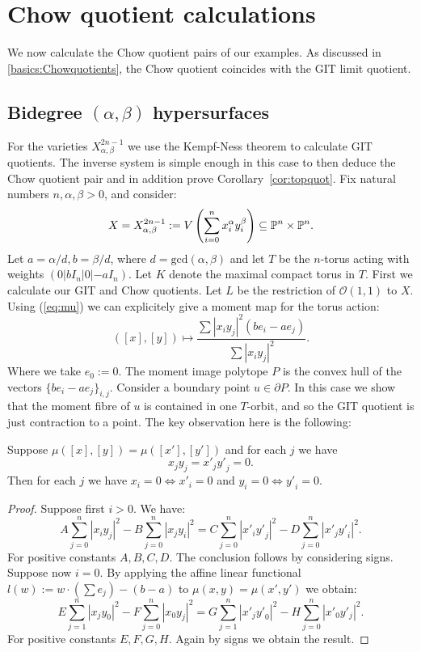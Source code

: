 \section{Chow quotient calculations}
We now calculate the Chow quotient pairs of our examples. As discussed in \ref{basics:Chowquotients}, the Chow quotient coincides with the GIT limit quotient.
\subsection{Bidegree $(\alpha,\beta)$ hypersurfaces} \label{subsec:hypersurfaces}
For the varieties \(X_{\alpha,\beta}^{2n-1}\) we use the Kempf-Ness theorem to calculate GIT quotients. The inverse system is simple enough in this case to then deduce the Chow quotient pair and in addition prove Corollary~\ref{cor:topquot}. Fix natural numbers \(n,\alpha,\beta>0\), and consider:
\[
X = X_{\alpha,\beta}^{2n-1} := V \left( \sum_{i=0}^n x_i^\alpha y_i^\beta \right) \subseteq \mathbb{P}^n \times \mathbb{P}^n.
\]
Let \(a = \alpha/d, b = \beta/d\), where \(d = \text{gcd}(\alpha,\beta)\) and let \(T\) be the \(n\)-torus acting with weights \((0|b I_n|0|-a I_n)\). Let \(K\) denote the maximal compact torus in \(T\).
First we calculate our GIT and Chow quotients. Let \(L\) be the restriction of \(  \mathcal{O}(1,1)\) to \(X\). Using (\ref{eq:mu}) we can explicitely give a moment map for the torus action:
\[
([x],[y]) \mapsto \frac{ \sum |x_iy_j|^2( b e_i - a e_j)}{\sum |x_iy_j|^2}.
\]
Where we take \(e_0 := 0\). The moment image polytope \(P\) is the convex hull of the vectors \(\{ b e_i - a e_j \}_{i,j}\). Consider a boundary point \(u \in \partial P\). In this case we show that the moment fibre of \(u\) is contained in one \(T\)-orbit, and so the GIT quotient is just contraction to a point. The key observation here is the following:
%
%
%
\begin{lemma}\label{lem:X}
Suppose \(\mu([x],[y]) = \mu([x'],[y'])\) and for each \(j\) we have
\[
x_jy_j = {x'}_j{y'}_j = 0.
\]
Then for each \(j\) we have \(x_i=0 \iff {x'}_i = 0\) and \(y_i = 0 \iff {y'}_i = 0 \).
\end{lemma}
%
%
%
\begin{proof}
Suppose first \(i>0\). We have:
\[
A \sum_{j=0}^n |x_iy_j|^2 - B\sum_{j=0}^n  |x_jy_i|^2  = C \sum_{j=0}^n  |{x'}_i{y'}_j|^2 - D \sum_{j=0}^n  |{x'}_j{y'}_i|^2.
\] 
For positive constants \(A,B,C,D\). The conclusion follows by considering signs. Suppose now \(i =0\). By applying the affine linear functional \(l(w) := w \cdot \left( \sum e_j \right) - (b-a)\) to  \(\mu(x,y) = \mu(x',y')\) we obtain:
\[
 E \sum_{j=1}^n  |x_jy_0|^2  - F \sum_{j=0}^n |x_0y_j|^2 =  G \sum_{j=1}^n  |{x'}_j{y'}_0|^2 - H \sum_{j=0}^n  |{x'_0}{y'_j}|^2.
\]
For positive constants \(E,F,G,H\). Again by signs we obtain the result.
\end{proof}
